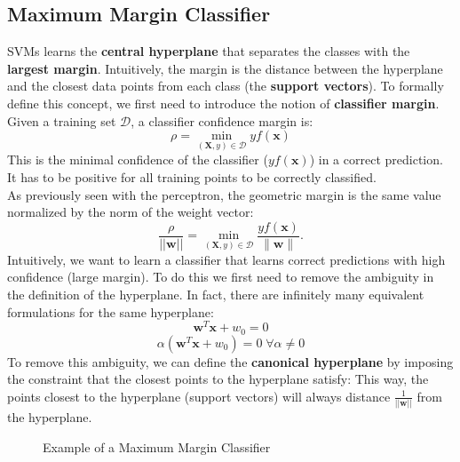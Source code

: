 \subsection{Maximum Margin Classifier}
SVMs learns the \textbf{central hyperplane} that separates the classes with the \textbf{largest margin}. Intuitively,
the margin is the distance between the hyperplane and the closest data points from each class (the \textbf{support vectors}).
To formally define this concept, we first need to introduce the notion of \textbf{classifier margin}.
{
    Given a training set $\mathcal{D}$, a classifier confidence margin is:
    \begin{equation}
        \rho = \min_{(\boldsymbol{X}, y) \in \mathcal{D}} yf(\boldsymbol{x})
    \end{equation}
    This is the minimal confidence of the classifier ($yf(\boldsymbol{x})$) in a correct prediction. 
    It has to be positive for all training points to be correctly classified.
    \\As previously seen with the perceptron, the geometric margin is the same value normalized by the norm of the weight vector:
    \begin{equation}
        \frac{\rho}{||\boldsymbol{w}||} = \min_{(\boldsymbol{X}, y) \in \mathcal{D}} \frac{yf(\boldsymbol{x})}{\|\boldsymbol{w}\|}.
    \end{equation}
}
Intuitively, we want to learn a classifier that learns correct predictions with high confidence (large margin).
To do this we first need to remove the ambiguity in the definition of the hyperplane.
In fact, there are infinitely many equivalent formulations for the same hyperplane:
\[ \boldsymbol{w}^T \boldsymbol{x} + w_0 = 0 \]
\[ \alpha (\boldsymbol{w}^T \boldsymbol{x} + w_0) = 0 \; \forall \alpha \neq 0\]
To remove this ambiguity, we can define the \textbf{canonical hyperplane} by imposing the constraint that the closest points 
to the hyperplane satisfy:
This way, the points closest to the hyperplane (support vectors) will always distance $\frac{1}{||\boldsymbol{w}||}$ from the hyperplane.
\begin{figure}[H]
    \label{fig:svm_margin}
    \caption{Example of a Maximum Margin Classifier}
\end{figure}

